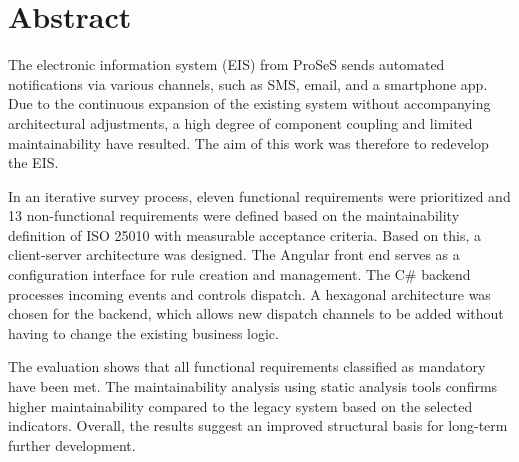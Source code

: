 \glsresetall
\newpage
\section*{Abstract} 
The electronic information system (EIS) from ProSeS sends automated notifications via various channels, such as SMS, email, and a smartphone app. Due to the continuous expansion of the existing system without accompanying architectural adjustments, a high degree of component coupling and limited maintainability have resulted. The aim of this work was therefore to redevelop the EIS.

In an iterative survey process, eleven functional requirements were prioritized and 13 non-functional requirements were defined based on the maintainability definition of ISO 25010 with measurable acceptance criteria. Based on this, a client-server architecture was designed. The Angular front end serves as a configuration interface for rule creation and management. The C\# backend processes incoming events and controls dispatch. A hexagonal architecture was chosen for the backend, which allows new dispatch channels to be added without having to change the existing business logic.

The evaluation shows that all functional requirements classified as mandatory have been met. The maintainability analysis using static analysis tools confirms higher maintainability compared to the legacy system based on the selected indicators. Overall, the results suggest an improved structural basis for long-term further development.